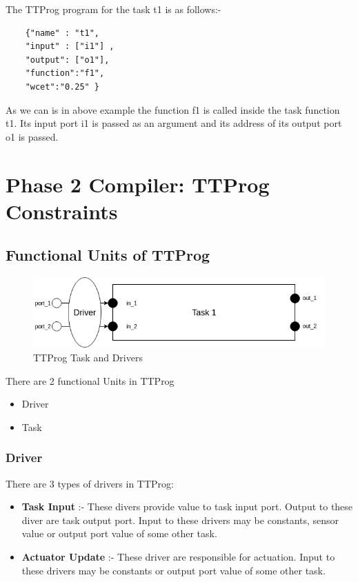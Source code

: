 \documentclass[16pt]{report}
\begin{document}
The TTProg program for the task t1 is as follows:-
\begin{verbatim}
    {"name" : "t1",
    "input" : ["i1"] , 
    "output": ["o1"], 
    "function":"f1", 
    "wcet":"0.25" }
\end{verbatim}
As we can is in above example the function f1 is called inside the task function t1. Its input port i1 is passed as an argument and its address of its output port o1 is passed.


\chapter{Phase 2 Compiler: TTProg Constraints}
\section{Functional Units of TTProg}
\begin{figure}[H]
\centering
\includegraphics[width=0.9\linewidth]{1TaskSplit.png}
\caption{TTProg Task and Drivers}
\end{figure}

There are 2 functional Units in TTProg
\begin{itemize}
    \item Driver
    \item Task
\end{itemize}

\subsection{Driver}
There are 3 types of drivers in TTProg:
\begin{itemize}
    \item \textbf{Task Input} :- These divers provide value to task input port. Output to these diver are task output port. Input to these drivers may be constants, sensor value or output port value of some other task.
    \item \textbf{Actuator Update} :- These driver are responsible for actuation. Input to these drivers may be constants or output port value of some other task.
\end{itemize}
\end{document}
